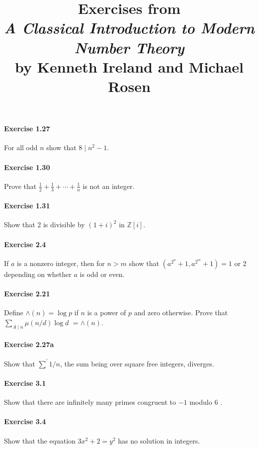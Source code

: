 \documentclass{article}
\title{\textbf{
Exercises from \\
\textit{A Classical Introduction to Modern Number Theory} \\
by Kenneth Ireland and Michael Rosen
}}
\date{}
\begin{document}
\maketitle


\paragraph{Exercise 1.27} For all odd $n$ show that $8 \mid n^{2}-1$.


\paragraph{Exercise 1.30} Prove that $\frac{1}{2}+\frac{1}{3}+\cdots+\frac{1}{n}$ is not an integer.


\paragraph{Exercise 1.31} Show that 2 is divisible by $(1+i)^{2}$ in $\mathbb{Z}[i]$.


\paragraph{Exercise 2.4} If $a$ is a nonzero integer, then for $n>m$ show that $\left(a^{2^{n}}+1, a^{2^{m}}+1\right)=1$ or 2 depending on whether $a$ is odd or even.


\paragraph{Exercise 2.21} Define $\wedge(n)=\log p$ if $n$ is a power of $p$ and zero otherwise. Prove that $\sum_{A \mid n} \mu(n / d) \log d$ $=\wedge(n)$.


\paragraph{Exercise 2.27a} Show that $\sum^{\prime} 1 / n$, the sum being over square free integers, diverges.


\paragraph{Exercise 3.1} Show that there are infinitely many primes congruent to $-1$ modulo 6 .


\paragraph{Exercise 3.4} Show that the equation $3 x^{2}+2=y^{2}$ has no solution in integers.
\end{document}

